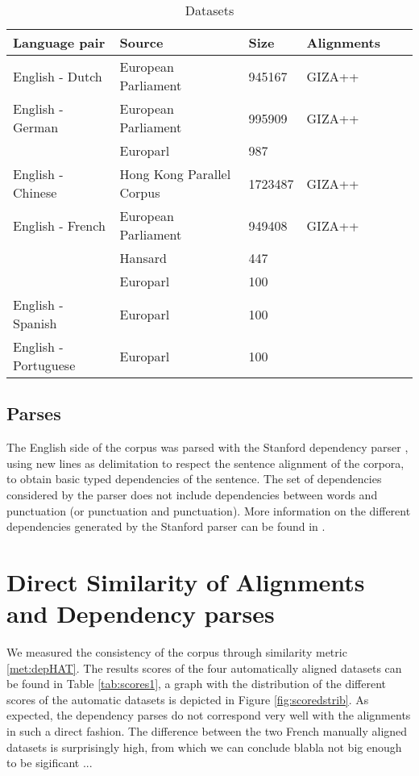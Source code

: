 \documentclass{report}
\begin{document}
\begin{table}
\begin{tabular}{|l|l|l|l|l|l|}
\hline
\bf Language pair & \bf Source & \bf Size & \bf Alignments\\
\hline \hline
English - Dutch & European Parliament & 945167 & {\small GIZA++} \\
\hline
English - German & European Parliament & 995909 & {\small GIZA++} \\
& Europarl & 987 & {\small\cite{pado2006optimal}}\\
\hline
English - Chinese & Hong Kong Parallel Corpus & 1723487 & {\small GIZA++} \\
\hline
English - French & European Parliament & 949408 & {\small GIZA++} \\
& Hansard & 447 & {\small \cite{och2000improved}}\\
& Europarl & 100 & {\small \cite{graca2008building}} \\
\hline
English - Spanish & Europarl & 100 & {\small \cite{graca2008building}} \\
\hline
English - Portuguese & Europarl & 100 & {\small \cite{graca2008building}}\\
\hline
\end{tabular}
\caption{Datasets}\label{tab:datasets}
\end{table}

\subsection{Parses}

The English side of the corpus was parsed with the Stanford dependency parser \citep{de2008stanford}, using new lines as delimitation to respect the sentence alignment of the corpora, to obtain basic typed dependencies of the sentence.  The set of dependencies considered by the parser does not include dependencies between words and punctuation (or punctuation and punctuation). More information on the different dependencies generated by the Stanford parser can be found in \cite{de2006generating}.

\section{Direct Similarity of Alignments and Dependency parses}

We measured the consistency of the corpus through similarity metric \ref{met:depHAT}. The results scores of the four automatically aligned datasets can be found in Table \ref{tab:scores1}, a graph with the distribution of the different scores of the automatic datasets is depicted in Figure \ref{fig:scoredstrib}. As expected, the dependency parses do not correspond very well with the alignments in such a direct fashion. The difference between the two French manually aligned datasets is surprisingly high, from which we can conclude blabla not big enough to be sigificant ...
\end{document}
